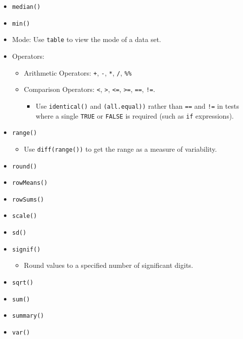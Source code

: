 \documentclass[
]{book}
\newenvironment{Shaded}{\begin{snugshade}}{\end{snugshade}}
\newcommand{\DataTypeTok}[1]{\textcolor[rgb]{0.13,0.29,0.53}{#1}}
\newcommand{\DecValTok}[1]{\textcolor[rgb]{0.00,0.00,0.81}{#1}}
\newcommand{\KeywordTok}[1]{\textcolor[rgb]{0.13,0.29,0.53}{\textbf{#1}}}
\newcommand{\NormalTok}[1]{#1}
\newcommand{\OperatorTok}[1]{\textcolor[rgb]{0.81,0.36,0.00}{\textbf{#1}}}
\newcommand{\StringTok}[1]{\textcolor[rgb]{0.31,0.60,0.02}{#1}}
\providecommand{\tightlist}{%
  \setlength{\itemsep}{0pt}\setlength{\parskip}{0pt}}
\begin{document}
\begin{Shaded}
\end{Shaded}

\begin{itemize}
\tightlist
\item
  \texttt{median()}
\item
  \texttt{min()}
\item
  Mode: Use \texttt{table} to view the mode of a data set.
\item
  Operators:

  \begin{itemize}
  \tightlist
  \item
    Arithmetic Operators: \texttt{+}, \texttt{-}, \texttt{*}, \texttt{/}, \texttt{\%\%}
  \item
    Comparison Operators: \texttt{\textless{}}, \texttt{\textgreater{}}, \texttt{\textless{}=}, \texttt{\textgreater{}=}, \texttt{==}, \texttt{!=}.

    \begin{itemize}
    \tightlist
    \item
      Use \texttt{identical()} and \texttt{(all.equal))} rather than \texttt{==} and \texttt{!=} in tests where a single \texttt{TRUE} or \texttt{FALSE} is required (such as \texttt{if} expressions).
    \end{itemize}
  \end{itemize}
\item
  \texttt{range()}

  \begin{itemize}
  \tightlist
  \item
    Use \texttt{diff(range())} to get the range as a measure of variability.
  \end{itemize}
\item
  \texttt{round()}
\item
  \texttt{rowMeans()}
\item
  \texttt{rowSums()}
\item
  \texttt{scale()}
\item
  \texttt{sd()}
\item
  \texttt{signif()}

  \begin{itemize}
  \tightlist
  \item
    Round values to a specified number of significant digits.
  \end{itemize}
\item
  \texttt{sqrt()}
\item
  \texttt{sum()}
\item
  \texttt{summary()}
\item
  \texttt{var()}
\end{itemize}
\end{document}
